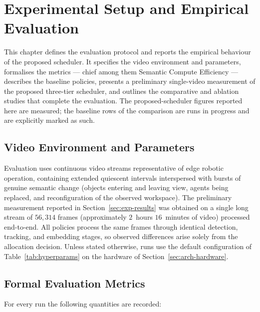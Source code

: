 \chapter{Experimental Setup and Empirical Evaluation}
\label{ch:experiments}

\begin{chapterabstract}
This chapter defines the evaluation protocol and reports the empirical
behaviour of the proposed scheduler. It specifies the video environment and
parameters, formalises the metrics --- chief among them Semantic Compute
Efficiency --- describes the baseline policies, presents a preliminary
single-video measurement of the proposed three-tier scheduler, and outlines
the comparative and ablation studies that complete the evaluation. The
proposed-scheduler figures reported here are measured; the baseline rows of
the comparison are runs in progress and are explicitly marked as such.
\end{chapterabstract}

\section{Video Environment and Parameters}
\label{sec:exp-setup}

Evaluation uses continuous video streams representative of edge robotic
operation, containing extended quiescent intervals interspersed with bursts of
genuine semantic change (objects entering and leaving view, agents being
replaced, and reconfiguration of the observed workspace). The preliminary
measurement reported in Section~\ref{sec:exp-results} was obtained on a single
long stream of $56{,}314$ frames (approximately $2$~hours $16$~minutes of
video) processed end-to-end. All policies process the same frames through
identical detection, tracking, and embedding stages, so observed differences
arise solely from the allocation decision. Unless stated otherwise, runs use
the default configuration of Table~\ref{tab:hyperparams} on the hardware of
Section~\ref{sec:arch-hardware}.

\section{Formal Evaluation Metrics}
\label{sec:exp-metrics}

For every run the following quantities are recorded:

